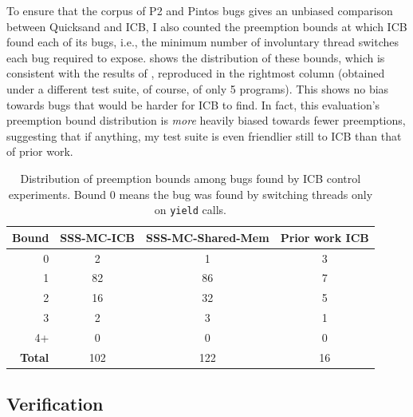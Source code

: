 To ensure that the corpus of P2 and Pintos bugs gives an unbiased comparison between Quicksand and ICB,
I also counted the preemption bounds at which ICB found each of its bugs,
i.e., the minimum number of involuntary thread switches each bug required to expose.
 shows the distribution of these bounds,
which is consistent with the results of \cite[Table 2]{chess-icb},
reproduced in the rightmost column
(obtained under a different test suite, of course, of only 5 programs).
This shows no bias towards bugs that would be harder for ICB to find.
In fact, this evaluation's preemption bound distribution is {\em more} heavily biased towards fewer preemptions,
suggesting that if anything,
my test suite is even friendlier still to ICB than that of prior work.

\begin{table}[t]
	\begin{center}
		\small
	\begin{tabular}{r||c|c||c}
		{\bf Bound} & {\bf SSS-MC-ICB} & {\bf SSS-MC-Shared-Mem} & {\bf Prior work ICB} \cite{chess-icb} \\
		\hline
		0         & 2     & 1     & 3 \\
		1         & 82    & 86    & 7 \\
		2         & 16    & 32    & 5 \\
		3         & 2     & 3     & 1 \\
		4+        & 0     & 0     & 0 \\
		\hline
		\bf Total & 102   & 122   & 16 \\
	\end{tabular}
	\end{center}
	\caption[Distribution preemption bounds among bugs found by ICB.]
	{Distribution of preemption bounds among bugs found by ICB control experiments.
	Bound 0 means the bug was found by switching threads only on {\tt yield} calls.}
	\label{tab:icb-bounds}
\end{table}


\subsection{Verification}
\label{sec:quicksand-eval-verif}


